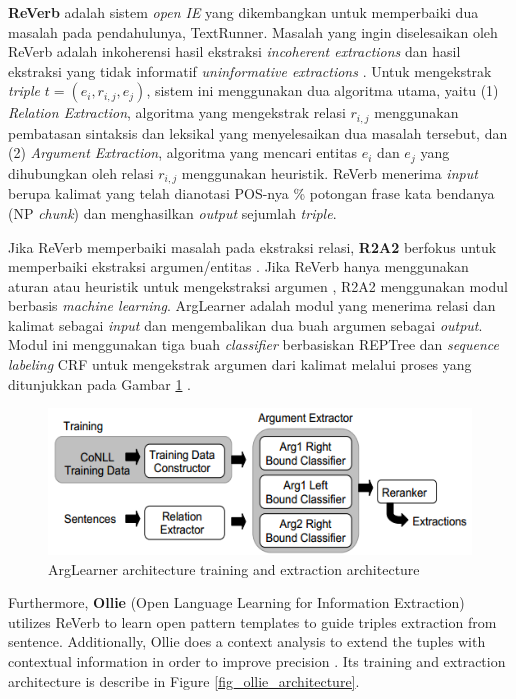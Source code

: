 \textbf{ReVerb} adalah sistem \textit{open IE} yang dikembangkan untuk memperbaiki dua masalah pada pendahulunya, TextRunner. Masalah yang ingin diselesaikan oleh ReVerb adalah inkoherensi hasil ekstraksi \textit{incoherent extractions} dan hasil ekstraksi yang tidak informatif \textit{uninformative extractions} \citep{fader2011identifying}. Untuk mengekstrak \textit{triple} $t = (e_i, r_{i,j}, e_j)$, sistem ini menggunakan dua algoritma utama, yaitu (1) \textit{Relation Extraction}, algoritma yang mengekstrak relasi $r_{i,j}$ menggunakan pembatasan sintaksis dan leksikal yang menyelesaikan dua masalah tersebut, dan (2) \textit{Argument Extraction}, algoritma yang mencari entitas $e_i$ dan $e_j$ yang dihubungkan oleh relasi $r_{i,j}$ menggunakan heuristik.  ReVerb menerima \textit{input} berupa kalimat yang telah dianotasi POS-nya \% potongan frase kata bendanya (NP \textit{chunk}) dan menghasilkan \textit{output} sejumlah \textit{triple}.

Jika ReVerb memperbaiki masalah pada ekstraksi relasi, \textbf{R2A2} berfokus untuk memperbaiki ekstraksi argumen/entitas \citep{etzioni2011open}. Jika ReVerb hanya menggunakan aturan atau heuristik untuk mengekstraksi argumen \citep{fader2011identifying}, R2A2 menggunakan modul berbasis \textit{machine learning}. ArgLearner adalah modul yang menerima relasi dan kalimat sebagai \textit{input} dan mengembalikan dua buah argumen sebagai \textit{output}. Modul ini menggunakan tiga buah \textit{classifier} berbasiskan REPTree dan \textit{sequence labeling} CRF untuk mengekstrak argumen dari kalimat melalui proses yang ditunjukkan pada Gambar \ref{fig_arglearner_architecture} \citep{etzioni2011open}.

\begin{figure}
\centering
\includegraphics[scale=0.5]{../images/arglearner_architecture.png}
\caption{ArgLearner architecture training and extraction architecture}
\label{fig_arglearner_architecture}
\end{figure}

Furthermore, \textbf{Ollie} (Open Language Learning for Information Extraction) \citep{schmitz2012open} utilizes ReVerb \citep{fader2011identifying} to learn open pattern templates to guide triples extraction from sentence. Additionally, Ollie does a context analysis to extend the tuples with contextual information in order to improve precision \citep{schmitz2012open}. Its training and extraction architecture is describe in Figure \ref{fig_ollie_architecture}.

